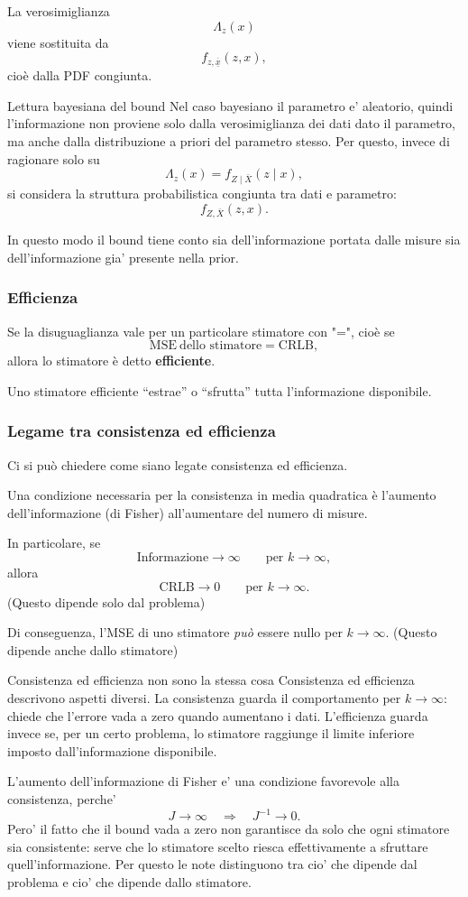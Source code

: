 \documentclass[11pt,a4paper]{article}
\begin{document}
La verosimiglianza
\[
\Lambda_z(x)
\]
viene sostituita da
\[
f_{z,\overline{\underline{x}}}(z,x),
\]
cioè dalla PDF congiunta.

\begin{spiegazione}{Lettura bayesiana del bound}
Nel caso bayesiano il parametro e' aleatorio, quindi l'informazione non proviene solo dalla verosimiglianza dei dati dato il parametro, ma anche dalla distribuzione a priori del parametro stesso. Per questo, invece di ragionare solo su
\[
\Lambda_z(x)=f_{Z\mid \bar X}(z\mid x),
\]
si considera la struttura probabilistica congiunta tra dati e parametro:
\[
f_{Z,\bar X}(z,x).
\]

In questo modo il bound tiene conto sia dell'informazione portata dalle misure sia dell'informazione gia' presente nella prior.
\end{spiegazione}

\subsubsection*{Efficienza}

Se la disuguaglianza vale per un particolare stimatore con "=", cioè se
\[
\mathrm{MSE}\ \text{dello stimatore}=\mathrm{CRLB},
\]
allora lo stimatore è detto \textbf{efficiente}.

Uno stimatore efficiente ``estrae'' o ``sfrutta'' tutta l'informazione disponibile.

\subsubsection*{Legame tra consistenza ed efficienza}

Ci si può chiedere come siano legate consistenza ed efficienza.

Una condizione necessaria per la consistenza in media quadratica è l'aumento dell'informazione (di Fisher) all'aumentare del numero di misure.

In particolare, se
\[
\text{Informazione} \to \infty
\qquad \text{per } k\to\infty,
\]
allora
\[
\mathrm{CRLB}\to 0
\qquad \text{per } k\to\infty.
\]
(Questo dipende solo dal problema)

Di conseguenza, l'MSE di uno stimatore \emph{può} essere nullo per \(k\to\infty\).
(Questo dipende anche dallo stimatore)

\begin{spiegazione}{Consistenza ed efficienza non sono la stessa cosa}
Consistenza ed efficienza descrivono aspetti diversi. La consistenza guarda il comportamento per $k\to\infty$: chiede che l'errore vada a zero quando aumentano i dati. L'efficienza guarda invece se, per un certo problema, lo stimatore raggiunge il limite inferiore imposto dall'informazione disponibile.

L'aumento dell'informazione di Fisher e' una condizione favorevole alla consistenza, perche'
\[
J\to\infty
\quad\Longrightarrow\quad
J^{-1}\to 0.
\]
Pero' il fatto che il bound vada a zero non garantisce da solo che ogni stimatore sia consistente: serve che lo stimatore scelto riesca effettivamente a sfruttare quell'informazione. Per questo le note distinguono tra cio' che dipende dal problema e cio' che dipende dallo stimatore.
\end{spiegazione}
\end{document}
